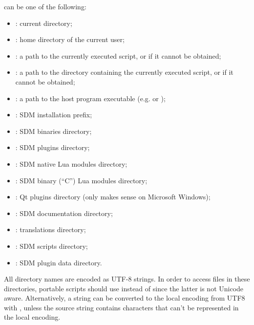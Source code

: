 \documentclass[a4paper,12pt,twoside,extrafontsizes]{memoir}
\begin{document}
\begin{funcremarks}
	 can be one of the following:
	
	\begin{itemize}
		\item {}: current directory;
		\item {}: home directory of the current user;
		\item {}: a path to the currently executed script, or  if it cannot be obtained;
		\item {}: a path to the directory containing the currently executed script, or  if it cannot be obtained;
		\item {}: a path to the host program executable (e.g.  or );
		\item {}: SDM installation prefix;
		\item {}: SDM binaries directory;
		\item {}: SDM plugins directory;
		\item {}: SDM native Lua modules directory;
		\item {}: SDM binary (``C'') Lua modules directory;
		\item {}: Qt plugins directory (only makes sense on Microsoft Windows);
		\item {}: SDM documentation directory;
		\item {}:  translations directory;
		\item {}: SDM scripts directory;
		\item {}: SDM plugin data directory.
	\end{itemize}

	All directory names are encoded as UTF-8 strings. In order to access files in these directories, portable scripts should use  instead of  since the latter is not Unicode aware. Alternatively, a string can be converted to the local encoding from UTF8 with , unless the source string contains characters that can't be represented in the local encoding.
\end{funcremarks}

\end{document}
